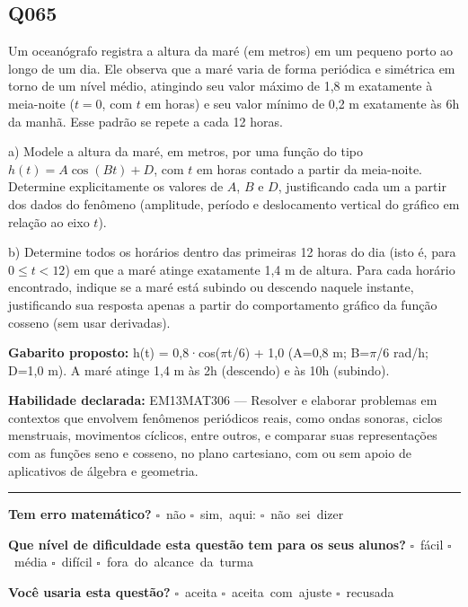 \documentclass[11pt,a4paper]{article}
\begin{document}
\begin{samepage}
\subsection*{Q065}
Um oceanógrafo registra a altura da maré (em metros) em um pequeno porto ao longo de um dia. Ele observa que a maré varia de forma periódica e simétrica em torno de um nível médio, atingindo seu valor máximo de 1,8 m exatamente à meia-noite ($t=0$, com $t$ em horas) e seu valor mínimo de 0,2 m exatamente às 6h da manhã. Esse padrão se repete a cada 12 horas.

a) Modele a altura da maré, em metros, por uma função do tipo $h(t) = A\cos(Bt) + D$, com $t$ em horas contado a partir da meia-noite. Determine explicitamente os valores de $A$, $B$ e $D$, justificando cada um a partir dos dados do fenômeno (amplitude, período e deslocamento vertical do gráfico em relação ao eixo $t$).

b) Determine todos os horários dentro das primeiras 12 horas do dia (isto é, para $0 \le t < 12$) em que a maré atinge exatamente 1,4 m de altura. Para cada horário encontrado, indique se a maré está subindo ou descendo naquele instante, justificando sua resposta apenas a partir do comportamento gráfico da função cosseno (sem usar derivadas).

\textbf{Gabarito proposto:} h(t) = 0,8·cos($\pi$t/6) + 1,0 (A=0,8 m; B=$\pi$/6 rad/h; D=1,0 m). A maré atinge 1,4 m às 2h (descendo) e às 10h (subindo).

\textbf{Habilidade declarada:} EM13MAT306 --- Resolver e elaborar problemas em contextos que envolvem fenômenos periódicos reais, como ondas sonoras, ciclos menstruais, movimentos cíclicos, entre outros, e comparar suas representações com as funções seno e cosseno, no plano cartesiano, com ou sem apoio de aplicativos de álgebra e geometria.
\end{samepage}

\noindent\rule{\linewidth}{0.4pt}
\textbf{Tem erro matemático?}\quad
\mbox{$\square$~não} \quad \mbox{$\square$~sim, aqui:} \underline{\hspace{5cm}}
\quad \mbox{$\square$~não sei dizer}

\textbf{Que nível de dificuldade esta questão tem para os seus alunos?}\quad
\mbox{$\square$~fácil} \quad \mbox{$\square$~média} \quad
\mbox{$\square$~difícil} \quad \mbox{$\square$~fora do alcance da turma}

\textbf{Você usaria esta questão?}\quad
\mbox{$\square$~aceita} \quad \mbox{$\square$~aceita com ajuste} \quad
\mbox{$\square$~recusada}
\end{document}

